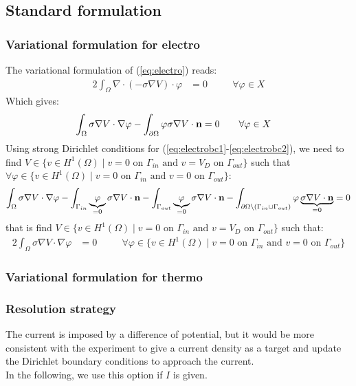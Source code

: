 \subsection{Standard formulation}
\subsubsection{Variational formulation for electro}
The variational formulation of (\ref{eq:electro}) reads:
\begin{alignat}{2}
  \int_\Omega \nabla\cdot(-\sigma\nabla V)\cdot\varphi &= 0
  && \quad \forall\varphi\in X
\end{alignat}
Which gives:
\begin{alignat}{2}
  \int_\Omega \sigma\nabla V\cdot\nabla\varphi
  - \int_{\partial\Omega} \varphi\sigma\nabla V\cdot \mathbf{n} &= 0
  && \quad \forall\varphi\in X
\end{alignat}
Using strong Dirichlet conditions for (\ref{eq:electrobc1}-\ref{eq:electrobc2}),
we need to find $V \in \{ v \in H^1(\Omega) \mid v = 0 \text{ on } \Gamma_{in}
\text{ and } v = V_D \text{ on } \Gamma_{out} \}$ such that $\forall \varphi
\in \{ v \in H^1(\Omega) \mid v = 0 \text{ on } \Gamma_{in} \text{ and } v = 0
\text{ on } \Gamma_{out} \}$:
\begin{equation*}
  \int_\Omega \sigma\nabla V\cdot\nabla\varphi
  - \int_{\Gamma_{in}} \underbrace{\varphi}_{=0}\sigma\nabla V\cdot \mathbf{n}
  - \int_{\Gamma_{out}} \underbrace{\varphi}_{=0}\sigma\nabla V\cdot \mathbf{n}
  - \int_{\partial\Omega\setminus(\Gamma_{in}\cup\Gamma_{out})}
  \varphi\underbrace{\sigma\nabla V\cdot \mathbf{n}}_{=0} = 0
\end{equation*}
that is find $V \in \{ v \in H^1(\Omega) \mid v = 0 \text{ on } \Gamma_{in}
\text{ and } v = V_D \text{ on } \Gamma_{out} \}$ such that:
\begin{alignat}{2}
  \label{eq:vf-electrostrong}
  \int_\Omega \sigma\nabla V\cdot\nabla\varphi &= 0
  && \quad \forall \varphi \in \{ v \in H^1(\Omega) \mid v = 0 \text{ on }
  \Gamma_{in} \text{ and } v = 0 \text{ on } \Gamma_{out} \}
\end{alignat}

\subsubsection{Variational formulation for thermo}

\subsubsection{Resolution strategy}
The current is imposed by a difference of potential, but it would be more
consistent with the experiment to give a current density as a target and
update the Dirichlet boundary conditions to approach the current.\\
In the following, we use this option if $I$ is given.

